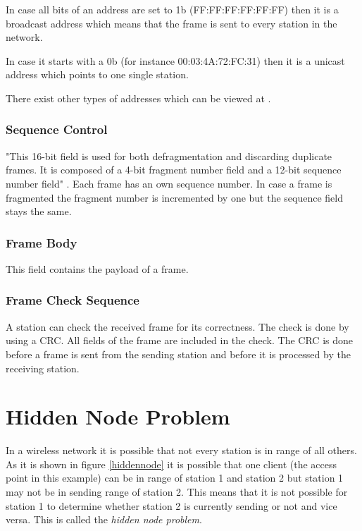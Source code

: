 In case all bits of an address are set to 1b (FF:FF:FF:FF:FF:FF) then it is a broadcast address which means that the frame is sent to every station in the network.

In case it starts with a 0b (for instance 00:03:4A:72:FC:31) then it is a unicast address which points to one single station.

There exist other types of addresses which can be viewed at \cite{mac_meaning}.

\subsubsection{Sequence Control}

"This 16-bit field is used for both defragmentation and discarding duplicate frames. It is composed of a 4-bit fragment number field and a 12-bit sequence number field" \cite[p.52]{80211wireless}. Each frame has an own sequence number. In case a frame is fragmented the fragment number is incremented by one but the sequence field stays the same.

\subsubsection{Frame Body}

This field contains the payload of a frame.

\subsubsection{Frame Check Sequence}

A station can check the received frame for its correctness. The check is done by using a CRC. All fields of the frame are included in the check. The CRC is done before a frame is sent from the sending station and before it is processed by the receiving station. %

\section{Hidden Node Problem}
\label{sec:hidden_node_problem}

In a wireless network it is possible that not every station is in range of all others. As it is shown in figure \ref{hiddennode} it is possible that one client (the access point in this example) can be in range of station 1 and station 2 but station 1 may not be in sending range of station 2. This means that it is not possible for station 1 to determine whether station 2 is currently sending or not and vice versa. This is called the {\em hidden node problem}.

